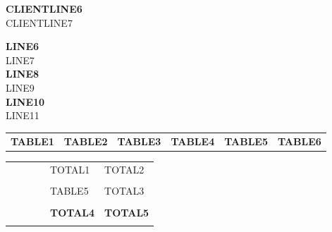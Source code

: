 \documentclass[a4paper]{article}
\newcommand{\lline}[2]{{\color{#1}\noindent\makebox[\linewidth][c]{\rule{1.02\textwidth}{#2}}}}
\begin{document}
    \vspace*{10pt} %
    \noindent
    \begin{minipage}[b]{0.5\textwidth}
        \vspace{0pt} %
        \begin{flushleft}
            \normalsize{\textbf{CLIENTLINE6}} \\
            \normalsize{CLIENTLINE7}
        \end{flushleft}
    \end{minipage}
    \hfill
    \begin{minipage}[b]{0.3\textwidth}
        \vspace{0pt} %
        \begin{flushright}
            \normalsize{\textbf{LINE6}} \\
            \normalsize{LINE7} \\
            \normalsize{\textbf{LINE8}} \\
            \normalsize{LINE9} \\
            \normalsize{\textbf{LINE10}} \\
            \normalsize{LINE11} \\
        \end{flushright}
    \end{minipage}

    \vspace*{20pt} %
    \noindent

    \begin{tabularx}{\linewidth}{
            >{\hsize=2\hsize}X
            >{\hsize=1\hsize}X
            >{\hsize=0.5\hsize}X
            >{\hsize=0.5\hsize}X
            >{\hsize=1\hsize}X
            >{\raggedleft\arraybackslash\hsize=1\hsize}X}
        \textbf{TABLE1} & \textbf{TABLE2} & \textbf{TABLE3} & \textbf{TABLE4} & \textbf{TABLE5} & \textbf{TABLE6}
    \end{tabularx}
    \vspace*{-10pt}
    \lline{blue}{0.8pt}

    \vspace*{10pt}

    \begin{tabularx}{\linewidth}{
            >{\hsize=2\hsize}X
            >{\hsize=1\hsize}X
            >{\hsize=0.5\hsize}X
            >{\hsize=0.5\hsize}X
            >{\raggedleft\arraybackslash\hsize=1\hsize}X
            >{\raggedleft\arraybackslash\hsize=1\hsize}X}
        &&&& TOTAL1 & TOTAL2 \\ \\
        &&&& TABLE5 & TOTAL3 \\ \\
        &&&& \textbf{TOTAL4} & \textbf{TOTAL5} \\ \\
    \end{tabularx}
\end{document}
